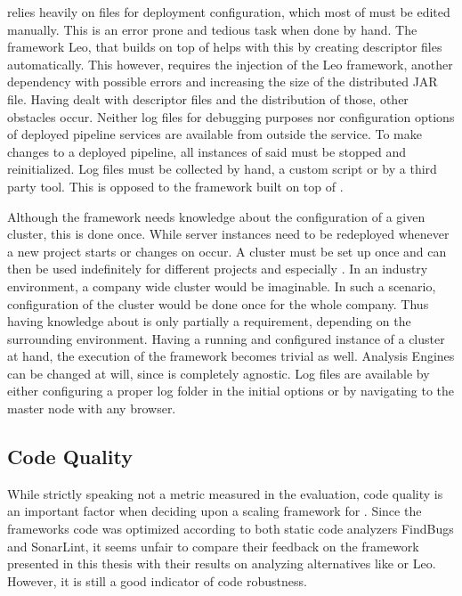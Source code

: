 \uimaas{} relies heavily on \xml{} files for deployment configuration, which most of must be edited manually. This is an error prone and tedious task when done by hand. The framework Leo, that builds on top of \uimaas{} helps with this by creating \xml{} descriptor files automatically. This however, requires the injection of the Leo framework, another dependency with possible errors and increasing the size of the distributed JAR file. Having dealt with \xml{} descriptor files and the distribution of those, other obstacles occur. Neither log files for debugging purposes nor configuration options of deployed pipeline services are available from outside the service. To make changes to a deployed pipeline, all instances of said \anen{} must be stopped and reinitialized. Log files must be collected by hand, a custom script or by a third party tool. This is opposed to the framework built on top of \spark{}.

Although the framework needs knowledge about the configuration of a given \spark{} cluster, this is done once. While \uimaas{} server instances need to be redeployed whenever a new project starts or changes on \anens{} occur. A \spark{} cluster must be set up once and can then be used indefinitely for different projects and especially \anens{}. In an industry environment, a company wide \spark{} cluster would be imaginable. In such a scenario, configuration of the \spark{} cluster would be done once for the whole company. Thus having knowledge about \spark{} is only partially a requirement, depending on the surrounding environment. Having a running and configured instance of a \spark{} cluster at hand, the execution of the framework becomes trivial as well. Analysis Engines can be changed at will, since \spark{} is completely \uima{} agnostic. Log files are available by either configuring a proper log folder in the initial \spark{} options or by navigating to the \spark{} master node with any browser.
\subsection{Code Quality}
While strictly speaking not a metric measured in the evaluation, code quality is an important factor when deciding upon a scaling framework for \uima{}. Since the frameworks code was optimized according to both static code analyzers FindBugs and SonarLint, it seems unfair to compare their feedback on the framework presented in this thesis with their results on analyzing alternatives like \uimaas{} or Leo. However, it is still a good indicator of code robustness.

